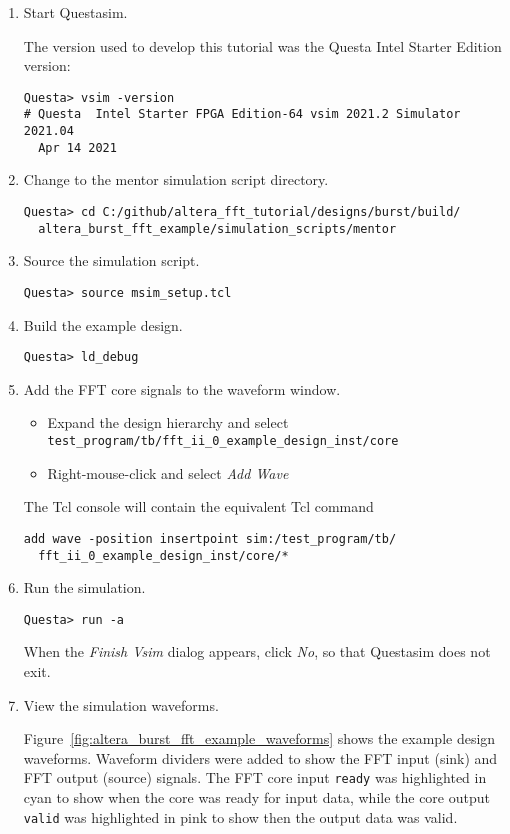 \begin{enumerate}
\item Start Questasim.

The version used to develop this tutorial was the Questa Intel Starter
Edition version:
%
\begin{verbatim}
Questa> vsim -version
# Questa  Intel Starter FPGA Edition-64 vsim 2021.2 Simulator 2021.04
  Apr 14 2021
\end{verbatim}
%
\item Change to the mentor simulation script directory.
%
\begin{verbatim}
Questa> cd C:/github/altera_fft_tutorial/designs/burst/build/
  altera_burst_fft_example/simulation_scripts/mentor
\end{verbatim}
\item Source the simulation script.
%
\begin{verbatim}
Questa> source msim_setup.tcl
\end{verbatim}
%
\item Build the example design.
%
\begin{verbatim}
Questa> ld_debug
\end{verbatim}
%
\item Add the FFT core signals to the waveform window.
%
\begin{itemize}
\item Expand the design hierarchy and select\\
\texttt{test\_program/tb/fft\_ii\_0\_example\_design\_inst/core}
\item Right-mouse-click and select \emph{Add Wave}
\end{itemize}
%
The Tcl console will contain the equivalent Tcl command
%
\begin{verbatim}
add wave -position insertpoint sim:/test_program/tb/
  fft_ii_0_example_design_inst/core/*
\end{verbatim}
%
\item Run the simulation.
%
\begin{verbatim}
Questa> run -a
\end{verbatim}
%
When the \emph{Finish Vsim} dialog appears, click \emph{No}, so that
Questasim does not exit.
%
\item View the simulation waveforms.

Figure~\ref{fig:altera_burst_fft_example_waveforms} shows the example design
waveforms. Waveform dividers were added to show the FFT input (sink) and FFT
output (source) signals. The FFT core input \texttt{ready} was highlighted in
cyan to show when the core was ready for input data, while the core
output \texttt{valid} was highlighted in pink to show then the output
data was valid.


\end{enumerate}
